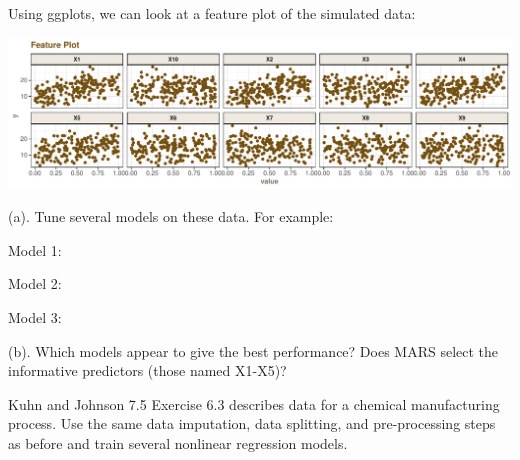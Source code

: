 \documentclass[]{report}
\newenvironment{Shaded}{\begin{snugshade}}{\end{snugshade}}
\newcommand{\CommentTok}[1]{\textcolor[rgb]{0.56,0.35,0.01}{\textit{#1}}}
\newcommand{\DataTypeTok}[1]{\textcolor[rgb]{0.13,0.29,0.53}{#1}}
\newcommand{\DecValTok}[1]{\textcolor[rgb]{0.00,0.00,0.81}{#1}}
\newcommand{\KeywordTok}[1]{\textcolor[rgb]{0.13,0.29,0.53}{\textbf{#1}}}
\newcommand{\NormalTok}[1]{#1}
\newcommand{\OperatorTok}[1]{\textcolor[rgb]{0.81,0.36,0.00}{\textbf{#1}}}
\newcommand{\StringTok}[1]{\textcolor[rgb]{0.31,0.60,0.02}{#1}}
\begin{document}
Using ggplots, we can look at a feature plot of the simulated data:

\includegraphics{Homework-Two_files/figure-latex/kj-7.2-ex3-1.pdf}

\begin{subquestion}{(a).} Tune several models on these data. For example: 
\end{subquestion}

\begin{Shaded}
\end{Shaded}

Model 1:

Model 2:

Model 3:

\begin{subquestion}{(b).}
Which models appear to give the best performance? Does MARS select the informative predictors (those named X1-X5)?
\end{subquestion}


\begin{question}{Kuhn and Johnson 7.5}
Exercise 6.3 describes data for a chemical manufacturing process. Use the same data imputation, data splitting, and pre-processing steps as before and train several nonlinear regression models.
\end{question}
\end{document}
